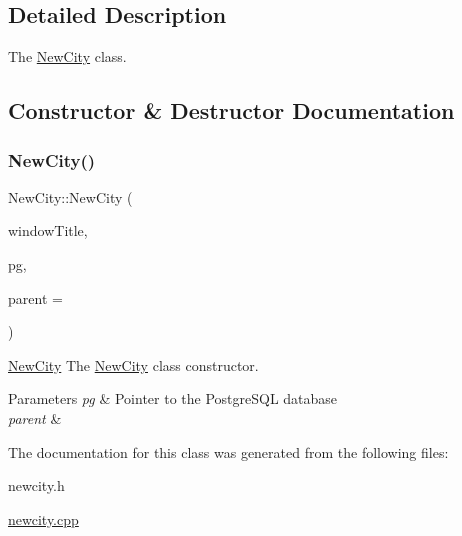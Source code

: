 \subsection{Detailed Description}
The \hyperlink{class_new_city}{New\+City} class. 

\subsection{Constructor \& Destructor Documentation}
\mbox{\label{class_new_city_a8b626e1fe480368bc7c2f819c1de6a19}} 
\subsubsection{\texorpdfstring{New\+City()}{NewCity()}}
{\footnotesize\ttfamily New\+City\+::\+New\+City (\begin{DoxyParamCaption}\item[{Q\+String}]{window\+Title,  }\item[{\hyperlink{classpsql}{psql} $\ast$}]{pg,  }\item[{Q\+Widget $\ast$}]{parent = {} }\end{DoxyParamCaption})\hspace{0.3cm}{\ttfamily [explicit]}}



\hyperlink{class_new_city}{New\+City} The \hyperlink{class_new_city}{New\+City} class constructor. 


\begin{DoxyParams}{Parameters}
{\em pg} & Pointer to the Postgre\+S\+QL database \\
\hline
{\em parent} & \\
\hline
\end{DoxyParams}


The documentation for this class was generated from the following files\+:\begin{DoxyCompactItemize}
\item 
newcity.\+h\item 
\hyperlink{newcity_8cpp}{newcity.\+cpp}\end{DoxyCompactItemize}
